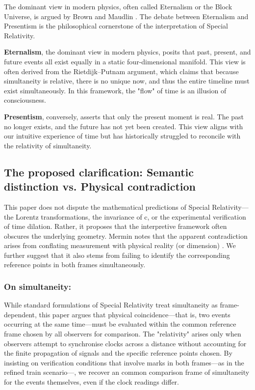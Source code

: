 \documentclass[a4paper,fleqn]{cas-sc}
\begin{document}
The dominant view in modern physics, often called Eternalism or the Block Universe, is argued by Brown \cite{brown2005} and Maudlin \cite{maudlin2012}. The debate between Eternalism and Presentism is the philosophical cornerstone of the interpretation of Special Relativity. 

		\textbf{Eternalism}, the dominant view in modern physics, posits that past, present, and future events all exist equally in a static four-dimensional manifold. This view is often derived from the Rietdijk–Putnam argument, which claims that because simultaneity is relative, there is no unique now, and thus the entire timeline must exist simultaneously. In this framework, the "flow" of time is an illusion of consciousness.

		\textbf{Presentism}, conversely, asserts that only the present moment is real. The past no longer exists, and the future has not yet been created. This view aligns with our intuitive experience of time but has historically struggled to reconcile with the relativity of simultaneity.
	\subsection{The proposed clarification: Semantic distinction vs. Physical contradiction}\label{subsec5_2}
	This paper does not dispute the mathematical predictions of Special Relativity—the Lorentz transformations, the invariance of c, or the experimental verification of time dilation. Rather, it proposes that the interpretive framework often obscures the underlying geometry. Mermin notes that the apparent contradiction arises from conflating measurement with physical reality (or dimension) \cite{mermin1984}. We further suggest that it also stems from failing to identify the corresponding reference points in both frames simultaneously.
	\subsubsection{On simultaneity:}\label{subsubsec5_2_1}
While standard formulations of Special Relativity treat simultaneity as frame-dependent, this paper argues that physical coincidence—that is, two events occurring at the same time—must be evaluated within the common reference frame chosen by all observers for comparison. The "relativity" arises only when observers attempt to synchronise clocks across a distance without accounting for the finite propagation of signals and the specific reference points chosen. By insisting on verification conditions that involve marks in both frames—as in the refined train scenario—, we recover an common comparison frame of simultaneity for the events themselves, even if the clock readings differ.
\end{document}
